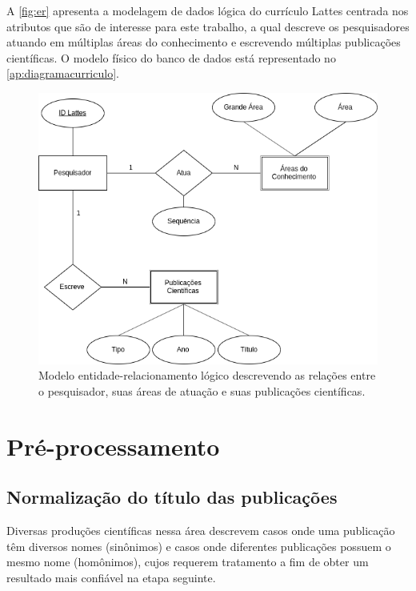 A \autoref{fig:er} apresenta a modelagem de dados lógica do currículo Lattes centrada nos atributos que são de interesse para este trabalho, a qual descreve os pesquisadores atuando em múltiplas áreas do conhecimento e escrevendo múltiplas publicações científicas. O modelo físico do banco de dados está representado no \autoref{ap:diagramacurriculo}.

\begin{figure}[htpb]
  \centering
  \includegraphics[scale=.5]{figuras/metodo-modelo-logico-lattes}
  \caption{Modelo entidade-relacionamento lógico descrevendo as relações entre o pesquisador, suas áreas de atuação e suas publicações científicas.}
  \label{fig:er}
\end{figure}

\section{Pré-processamento}

\subsection{Normalização do título das publicações}

Diversas produções científicas nessa área \cite{franceschet2011collaboration} \cite{mena2013prospecccao} \cite{reuther2006managing} descrevem casos onde uma publicação têm diversos nomes (sinônimos) e casos onde diferentes publicações possuem o mesmo nome (homônimos), cujos requerem tratamento a fim de obter um resultado mais confiável na etapa seguinte.

